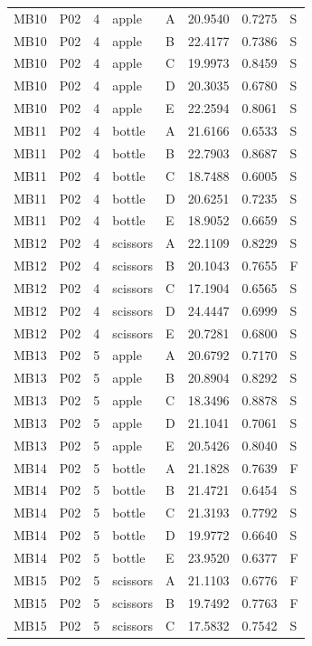 \documentclass[11pt]{article}
\begin{document}
\begin{longtable}{lll llrrl}
MB10 & P02 & 4 & apple & A & 20.9540 & 0.7275 & S \\
MB10 & P02 & 4 & apple & B & 22.4177 & 0.7386 & S \\
MB10 & P02 & 4 & apple & C & 19.9973 & 0.8459 & S \\
MB10 & P02 & 4 & apple & D & 20.3035 & 0.6780 & S \\
MB10 & P02 & 4 & apple & E & 22.2594 & 0.8061 & S \\
MB11 & P02 & 4 & bottle & A & 21.6166 & 0.6533 & S \\
MB11 & P02 & 4 & bottle & B & 22.7903 & 0.8687 & S \\
MB11 & P02 & 4 & bottle & C & 18.7488 & 0.6005 & S \\
MB11 & P02 & 4 & bottle & D & 20.6251 & 0.7235 & S \\
MB11 & P02 & 4 & bottle & E & 18.9052 & 0.6659 & S \\
MB12 & P02 & 4 & scissors & A & 22.1109 & 0.8229 & S \\
MB12 & P02 & 4 & scissors & B & 20.1043 & 0.7655 & F \\
MB12 & P02 & 4 & scissors & C & 17.1904 & 0.6565 & S \\
MB12 & P02 & 4 & scissors & D & 24.4447 & 0.6999 & S \\
MB12 & P02 & 4 & scissors & E & 20.7281 & 0.6800 & S \\
MB13 & P02 & 5 & apple & A & 20.6792 & 0.7170 & S \\
MB13 & P02 & 5 & apple & B & 20.8904 & 0.8292 & S \\
MB13 & P02 & 5 & apple & C & 18.3496 & 0.8878 & S \\
MB13 & P02 & 5 & apple & D & 21.1041 & 0.7061 & S \\
MB13 & P02 & 5 & apple & E & 20.5426 & 0.8040 & S \\
MB14 & P02 & 5 & bottle & A & 21.1828 & 0.7639 & F \\
MB14 & P02 & 5 & bottle & B & 21.4721 & 0.6454 & S \\
MB14 & P02 & 5 & bottle & C & 21.3193 & 0.7792 & S \\
MB14 & P02 & 5 & bottle & D & 19.9772 & 0.6640 & S \\
MB14 & P02 & 5 & bottle & E & 23.9520 & 0.6377 & F \\
MB15 & P02 & 5 & scissors & A & 21.1103 & 0.6776 & F \\
MB15 & P02 & 5 & scissors & B & 19.7492 & 0.7763 & F \\
MB15 & P02 & 5 & scissors & C & 17.5832 & 0.7542 & S \\

\end{longtable}
\end{document}
